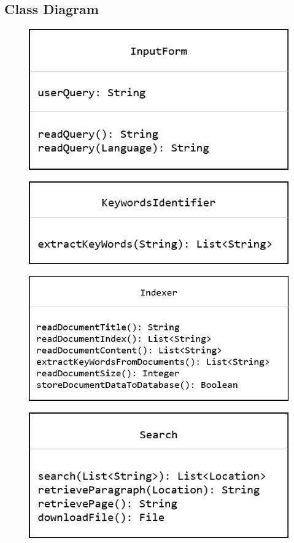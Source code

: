\documentclass[oneside,a4paper,12pt]{report}
\begin{document}
\subsection{Class Diagram}
\begin{figure}[H]
\includegraphics{class_input_form}
\end{figure}

\begin{figure}[H]
\includegraphics{class_keyword_identifier}
\end{figure}

\begin{figure}[H]
\includegraphics{class_indexer}
\end{figure}

\begin{figure}[H]
\includegraphics{class_search}
\end{figure}
\end{document}
